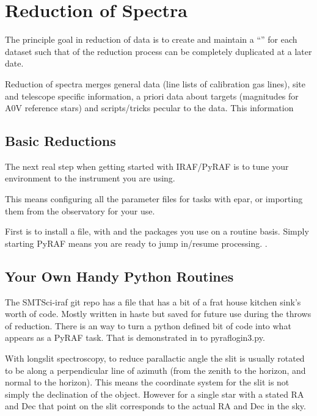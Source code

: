 \clearpage
\renewcommand{\footerfilename}{ReductionSpectra.tex}

\section{Reduction of Spectra} \label{sec:ReductionOfSpectra}

The principle goal in reduction of data is to create and maintain a ``'' for each dataset such that  of the
reduction process can be completely duplicated at a later date. 

Reduction of spectra merges general data (line lists of calibration gas
lines), site and telescope specific information, a priori data about
targets (magnitudes for A0V reference stars) and scripts/tricks pecular
to the data. This information

\subsection{Basic Reductions}

The next real step when getting started with IRAF/PyRAF is to tune your
environment to the instrument you are using.

This means configuring all the parameter files for tasks with epar, or importing
them from the observatory for your use.

First is to install a  file, with  and
the packages you use on a routine basis. Simply starting PyRAF means you
are ready to jump in/resume processing.  .

\subsection{Your Own Handy Python Routines}

The SMTSci-iraf git repo has a  file that has a bit
of a frat house kitchen sink's worth of code. Mostly written in haste
but saved for future use during the throws of reduction. There is an 
way to turn a python defined bit of code into what appears as a PyRAF task.
That is demonstrated in to pyraflogin3.py.

With longslit spectroscopy, to reduce parallactic angle
 
 the slit is usually rotated to be along
a perpendicular line of azimuth (from the zenith to the horizon, and normal to the
horizon). This means the coordinate system for the slit is not simply the
declination of the object. However for a single star with a stated RA and
Dec that point on the slit corresponds to the actual RA and Dec in the sky.


